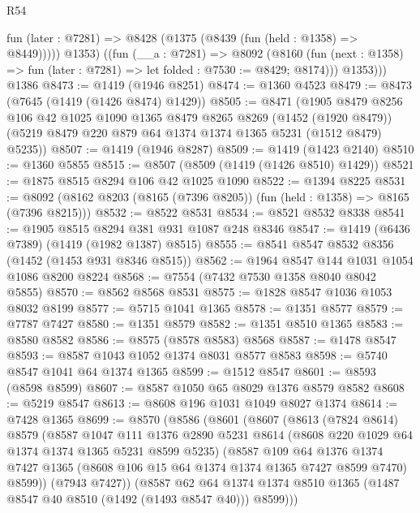 \begin{lexlean}{R54}
\begin{coremodule}
          fun (later : @7281) => @8428 (@1375 (@8439 (fun (held : @1358) => @8449)))))
          @1353)
        ((fun (__a : @7281) =>
        @8092
          (@8160 (fun (next : @1358) => fun (later : @7281) => let folded : @7530 := @8429; @8174)))
          @1353)))
    @1386
@8473 := @1419 (@1946 @8251)
@8474 := @1360 @4523
@8479 := @8473 (@7645 (@1419 (@1426 @8474) @1429))
@8505 := @8471
    (@1905
      @8479
      @8256
      @106
      @42
      @1025
      @1090
      @1365
      @8479
      @8265
      @8269
      (@1452 (@1920 @8479))
      (@5219 @8479 @220 @879 @64 @1374 @1374 @1365 @5231 (@1512 @8479) @5235))
@8507 := @1419 (@1946 @8287)
@8509 := @1419 (@1423 @2140)
@8510 := @1360 @5855
@8515 := @8507 (@8509 (@1419 (@1426 @8510) @1429))
@8521 := @1875 @8515 @8294 @106 @42 @1025 @1090
@8522 := @1394 @8225
@8531 := @8092 (@8162 @8203 (@8165 (@7396 @8205)) (fun (held : @1358) => @8165 (@7396 @8215)))
@8532 := @8522 @8531
@8534 := @8521 @8532 @8338
@8541 := @1905 @8515 @8294 @381 @931 @1087 @248 @8346
@8547 := @1419 (@6436 @7389) (@1419 (@1982 @1387) @8515)
@8555 := @8541 @8547 @8532 @8356 (@1452 (@1453 @931 @8346 @8515))
@8562 := @1964 @8547 @144 @1031 @1054 @1086 @8200 @8224
@8568 := @7554 (@7432 @7530 @1358 @8040 @8042 @5855)
@8570 := @8562 @8568 @8531
@8575 := @1828 @8547 @1036 @1053 @8032 @8199
@8577 := @5715 @1041 @1365
@8578 := @1351 @8577
@8579 := @7787 @7427
@8580 := @1351 @8579
@8582 := @1351 @8510 @1365
@8583 := @8580 @8582
@8586 := @8575 (@8578 @8583) @8568
@8587 := @1478 @8547
@8593 := @8587 @1043 @1052 @1374 @8031 @8577 @8583
@8598 := @5740 @8547 @1041 @64 @1374 @1365
@8599 := @1512 @8547
@8601 := @8593 (@8598 @8599)
@8607 := @8587 @1050 @65 @8029 @1376 @8579 @8582
@8608 := @5219 @8547
@8613 := @8608 @196 @1031 @1049 @8027 @1374
@8614 := @7428 @1365
@8699 := @8570
    (@8586
      (@8601
        (@8607
          (@8613
            (@7824 @8614)
            @8579
            (@8587
              @1047
              @111
              @1376
              @2890
              @5231
              @8614
              (@8608 @220 @1029 @64 @1374 @1374 @1365 @5231 @8599 @5235)
              (@8587
                @109
                @64
                @1376
                @1374
                @7427
                @1365
                (@8608 @106 @15 @64 @1374 @1374 @1365 @7427 @8599 @7470)
                @8599))
            (@7943 @7427))
          (@8587
            @62
            @64
            @1374
            @1374
            @8510
            @1365
            (@1487 @8547 @40 @8510 (@1492 (@1493 @8547 @40)))
            @8599)))

\end{coremodule}
\end{lexlean}
